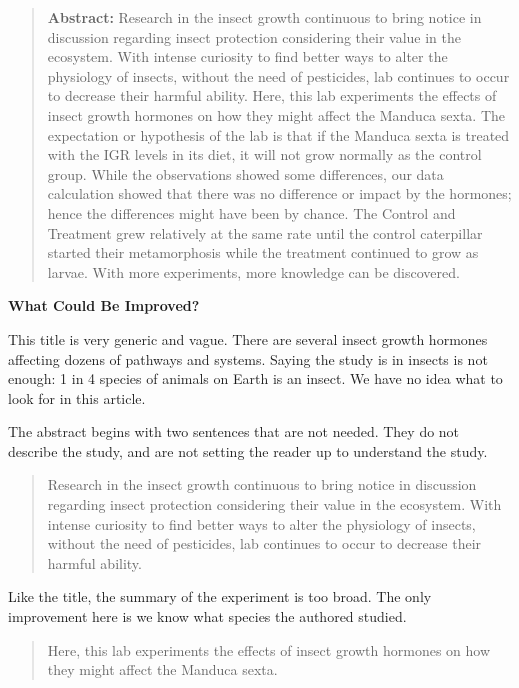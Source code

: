 \documentclass[
]{book}
\begin{document}
\begin{quote}
\textbf{Abstract:} Research in the insect growth continuous to bring notice in discussion regarding insect protection considering their value in the ecosystem. With intense curiosity to find better ways to alter the physiology of insects, without the need of pesticides, lab continues to occur to decrease their harmful ability. Here, this lab experiments the effects of insect growth hormones on how they might affect the Manduca sexta. The expectation or hypothesis of the lab is that if the Manduca sexta is treated with the IGR levels in its diet, it will not grow normally as the control group. While the observations showed some differences, our data calculation showed that there was no difference or impact by the hormones; hence the differences might have been by chance. The Control and Treatment grew relatively at the same rate until the control caterpillar started their metamorphosis while the treatment continued to grow as larvae. With more experiments, more knowledge can be discovered.
\end{quote}

\textbf{What Could Be Improved?}

This title is very generic and vague. There are several insect growth hormones affecting dozens of pathways and systems. Saying the study is in insects is not enough: 1 in 4 species of animals on Earth is an insect. We have no idea what to look for in this article.

The abstract begins with two sentences that are not needed. They do not describe the study, and are not setting the reader up to understand the study.

\begin{quote}
Research in the insect growth continuous to bring notice in discussion regarding insect protection considering their value in the ecosystem. With intense curiosity to find better ways to alter the physiology of insects, without the need of pesticides, lab continues to occur to decrease their harmful ability.
\end{quote}

Like the title, the summary of the experiment is too broad. The only improvement here is we know what species the authored studied.

\begin{quote}
Here, this lab experiments the effects of insect growth hormones on how they might affect the Manduca sexta.
\end{quote}
\end{document}
